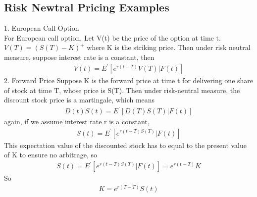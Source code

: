 \documentclass[a4paper]{article}
\begin{document}
\subsection{Risk Newtral Pricing Examples}
1. European Call Option\\
For European call option, Let V(t) be the price of the option at time t.  $V(T) = (S(T) - K)^{+}$ where K is the striking price. Then under risk neutral measure, suppose interest rate is a constant, then
\begin{align*}
	V(t) = E^{'}[e^{r(t-T)}V(T)|F(t)]
\end{align*}
2. Forward Price
Suppose K is the forward price at time t for delivering one share of stock at time T, whose price is S(T). Then under risk-neutral measure, the discount stock price is a martingale, which means
\begin{align*}
	D(t)S(t) = E^{'}[D(T) S(T)|F(t)]
\end{align*}
again, if we assume interest rate r is a constant,
\begin{align*}
	S(t) = E^{'}[e^{r(t-T)S(T)}|F(t)]
\end{align*}
This expectation value of the discounted stock has to equal to the present value of K to ensure no arbitrage, so
\begin{align*}
	S(t) = E^{'}[e^{r(t-T)S(T)}|F(t)] = e^{r(t-T)}K
\end{align*}
So
\begin{align*}
	K = e^{r(T-T)}S(t)
\end{align*}
\end{document}
